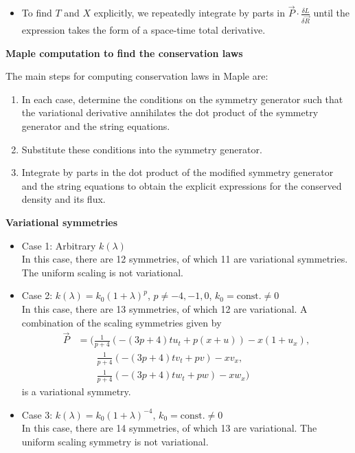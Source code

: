 \documentclass[landscape]{slides}
\def\myemph#1{\textcolor{blue}{\em #1}}
\def\const{\text{const.}}
\begin{document}
\begin{itemize}
\newpage

where 
\[
T = \vec{P} \cdot \partial_{\vec{R}_t} L - A
\]
is the \myemph{conserved density}, 
and 
\[
X = \vec{P} \cdot \partial_{\vec{R}_x} L - B
\]
is its \myemph{flux}. 
\item
To find $T$ and $X$ explicitly, 
we repeatedly integrate by parts in $ \vec{P} \cdot \frac{\delta L}{\delta \vec{R}}$ 
until the expression takes the form of a space-time total derivative.
\end{itemize}
\hfil

\newpage

\textbf{Maple computation to find the conservation laws}


The main steps for computing conservation laws in Maple are:
\begin{enumerate}
\item
In each case, determine the conditions on the symmetry generator such that the variational derivative annihilates the dot product of the symmetry generator and the string equations.
\item
Substitute these conditions into the symmetry generator.
\item 
Integrate by parts in the dot product of the modified symmetry generator and the string equations to obtain the explicit expressions for the conserved density and its flux.
\end{enumerate}

\newpage 

\begin{center}
\textbf{Variational symmetries}
\end{center}
\begin{itemize}
\item
Case 1: Arbitrary $k(\lambda)$\\
In this case, there are 12 symmetries, of which 11 are variational symmetries. The uniform scaling is not variational.

\item
Case 2: $k(\lambda) = k_0 (1+\lambda)^{p}$,
\quad
$p \neq -4, -1, 0$, 
\quad
$k_0 = \const \neq 0$\\
In this case, there are 13 symmetries, of which 12 are variational. A combination of the scaling symmetries given by
\[\begin{aligned}
\vec{P} &= 
(
\frac{1}{p+4} ( -(3p + 4) t u_t + p (x+u)) - x (1 + u_x), \\
& \quad \quad \frac{1}{p+4} ( -(3p + 4) t v_t + p v) - x v_x, \\
& \quad \quad \frac{1}{p+4} ( -(3p + 4) t w_t + p w) - x w_x
)
\end{aligned}\]
is a variational symmetry.

\item
Case 3: $k(\lambda) = k_0 (1+\lambda)^{-4}$,
\quad
$k_0 = \const\neq 0$\\
In this case, there are 14 symmetries, of which 13 are variational. The uniform scaling symmetry is not variational.
\end{itemize}
\end{document}

